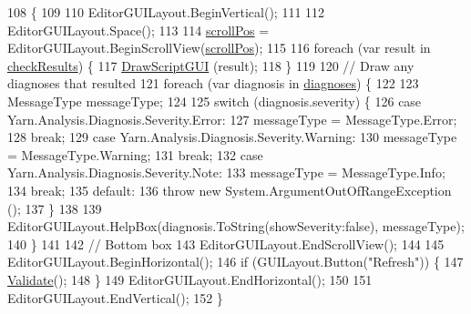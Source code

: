 \begin{DoxyCode}
108                      \{
109 
110             EditorGUILayout.BeginVertical();
111 
112             EditorGUILayout.Space();
113 
114             \hyperlink{a00099_a2d9b9702b0980af9d4202aebd440124b}{scrollPos} = EditorGUILayout.BeginScrollView(\hyperlink{a00099_a2d9b9702b0980af9d4202aebd440124b}{scrollPos});
115 
116             \textcolor{keywordflow}{foreach} (var result \textcolor{keywordflow}{in} \hyperlink{a00099_aa85ab7bd194e5425b991b9c216d4d10e}{checkResults}) \{
117                 \hyperlink{a00099_a1a7e1a855bb2a9549eb1c0eb292c9b85}{DrawScriptGUI} (result);
118             \}
119 
120             \textcolor{comment}{// Draw any diagnoses that resulted}
121             \textcolor{keywordflow}{foreach} (var diagnosis \textcolor{keywordflow}{in} \hyperlink{a00099_ab4784aaee761b7c60bb142cd410eb774}{diagnoses}) \{
122 
123                 MessageType messageType;
124 
125                 \textcolor{keywordflow}{switch} (diagnosis.severity) \{
126                 \textcolor{keywordflow}{case} Yarn.Analysis.Diagnosis.Severity.Error:
127                     messageType = MessageType.Error;
128                     \textcolor{keywordflow}{break};
129                 \textcolor{keywordflow}{case} Yarn.Analysis.Diagnosis.Severity.Warning:
130                     messageType = MessageType.Warning;
131                     \textcolor{keywordflow}{break};
132                 \textcolor{keywordflow}{case} Yarn.Analysis.Diagnosis.Severity.Note:
133                     messageType = MessageType.Info;
134                     \textcolor{keywordflow}{break};
135                 \textcolor{keywordflow}{default}:
136                     \textcolor{keywordflow}{throw} \textcolor{keyword}{new} System.ArgumentOutOfRangeException ();
137                 \}
138 
139                 EditorGUILayout.HelpBox(diagnosis.ToString(showSeverity:\textcolor{keyword}{false}), messageType);
140             \}
141 
142             \textcolor{comment}{// Bottom box}
143             EditorGUILayout.EndScrollView();
144 
145             EditorGUILayout.BeginHorizontal();
146             \textcolor{keywordflow}{if} (GUILayout.Button(\textcolor{stringliteral}{"Refresh"})) \{
147                 \hyperlink{a00099_ac4dbc30419c5647c1a2587b2ff7abd7c}{Validate}();
148             \}
149             EditorGUILayout.EndHorizontal();
150 
151             EditorGUILayout.EndVertical();
152         \}
\end{DoxyCode}

